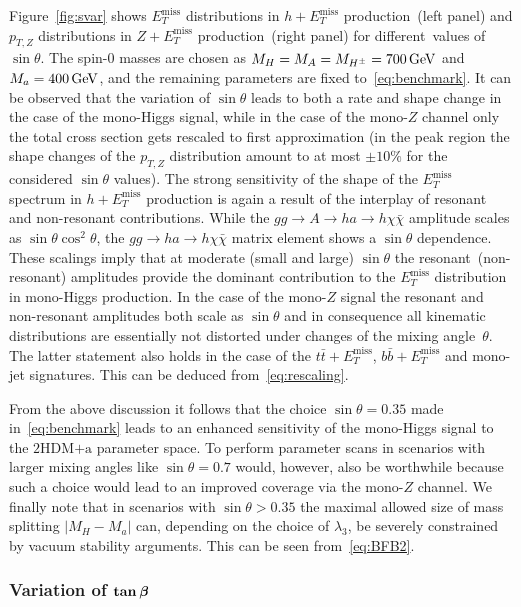 \documentclass[a4paper, 11pt,notoc]{article}
\newcommand{\MET}{\ensuremath{E_T^\mathrm{miss}}\xspace}
\newcommand{\mA}{\ensuremath{M_{A}}\xspace}
\newcommand{\ma}{\ensuremath{M_{a}}\xspace}
\newcommand{\mH}{\ensuremath{M_{H}}\xspace}
\newcommand{\mHc}{\ensuremath{M_{H^{\pm}}}\xspace}
\newcommand{\hdma}{\ensuremath{\textrm{2HDM+a}}\xspace}
\def\bm#1{\mbox{\boldmath$#1$\unboldmath}}
\begin{document}
Figure~\ref{fig:svar} shows $\MET$ distributions in $h + \MET$ production~(left panel) and $p_{T,Z}$ distributions in $Z+\MET$ production~(right panel) for different~values of $\sin \theta$. The spin-0 masses are chosen as $\mH = \mA = \mHc = 700 \, {\rm GeV}$ and $\ma = 400 \, {\rm GeV}$, and the remaining parameters are fixed to~\eqref{eq:benchmark}. It can be observed that the variation of $\sin \theta$ leads to both a rate and shape change in the case of the mono-Higgs signal, while in the case of the mono-$Z$ channel only the total cross section gets rescaled to first approximation (in the peak region the shape changes of the $p_{T,Z}$ distribution amount to at most $\pm 10\%$ for the considered $\sin \theta$ values). The strong sensitivity of the shape of the $\MET$ spectrum in $h + \MET$ production is again a result of the interplay of resonant and non-resonant contributions. While the $gg \to A \to h a \to h \chi \bar \chi$  amplitude scales as $\sin \theta \cos^2 \theta$, the $gg \to h a  \to h \chi \bar \chi$ matrix element shows a $\sin \theta$ dependence. These scalings imply that at moderate  (small and large) $\sin \theta$ the resonant~(non-resonant) amplitudes provide the dominant contribution to the $\MET$ distribution in mono-Higgs production.  In the case of the mono-$Z$ signal the resonant and non-resonant amplitudes both scale as $\sin \theta$ and in consequence  all kinematic distributions are essentially not distorted  under changes of the mixing angle~$\theta$. The latter statement also holds in the case of the $t \bar t +\MET$, $b \bar b + \MET$ and mono-jet signatures.  This can be deduced from~\eqref{eq:rescaling}. 

From the above discussion it follows that the choice $\sin \theta = 0.35$ made in~\eqref{eq:benchmark} leads to an enhanced sensitivity of the mono-Higgs signal to the \hdma parameter space. To perform parameter scans in scenarios with larger mixing angles like $\sin \theta = 0.7$ would, however, also be worthwhile because such a choice would lead to an improved coverage via the mono-$Z$ channel. We finally note that in scenarios with $\sin \theta >0.35$ the maximal allowed size of mass splitting $|M_H - M_a|$ can, depending on the choice of $\lambda_3$, be severely constrained by vacuum stability arguments. This can be seen from~\eqref{eq:BFB2}. 

\subsubsection[Variation of $\tan \beta$]{Variation of $\bm{\tan \beta}$}
\label{sec:variationtanb}
\end{document}
